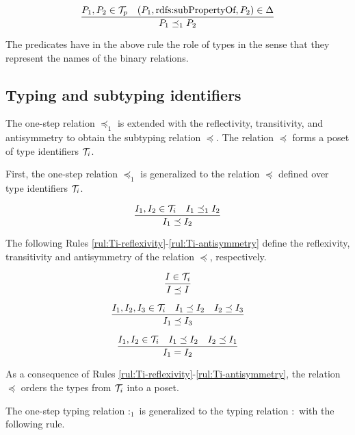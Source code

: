 \documentclass[runningheads]{llncs}
\newcommand{\DD}{{\Delta}}
\newcommand{\TT}{{\cal T}}
\begin{document}
\begin{equation}
\dfrac{P_1,P_2\in\TT_p \quad (P_1,\text{rdfs:subPropertyOf},P_2)\in\DD}
      {P_1\preceq_1\/P_2}
\end{equation}

The predicates have in the above rule the role of types in the sense
that they represent the names of the binary relations. 



\subsection{Typing and subtyping identifiers\label{sec:idents-typing}}

The one-step relation $\preceq_1$ is extended with the
reflectivity, transitivity, and antisymmetry to obtain the subtyping
relation $\preceq$. The relation $\preceq$ forms a poset of type
identifiers $\TT_i$.

First, the one-step relation $\preceq_1$ is generalized to the
relation $\preceq$ defined over type identifiers $\TT_i$.

\begin{equation}
\label{rul:Ic-extended}
\dfrac{I_1,I_2\in\TT_i \quad I_1\preceq_1\/I_2}
      {I_1 \preceq I_2}
\end{equation}

The following Rules \ref{rul:Ti-reflexivity}-\ref{rul:Ti-antisymmetry}
define the reflexivity, transitivity and antisymmetry of the
relation $\preceq$, respectively.

\begin{equation}
\label{rul:Ti-reflexivity}
\dfrac{I\in\TT_i}
      {I\preceq\/I}
\end{equation}

\begin{equation}
\label{rul:Ti-transitivity}
\dfrac{I_1,I_2,I_3\in\TT_i\quad\/I_1\preceq\/I_2\quad\/I_2\preceq\/I_3}
      {I_1\preceq\/I_3}   
\end{equation}

\begin{equation}
\label{rul:Ti-antisymmetry}
\dfrac{I_1,I_2\in\TT_i \quad I_1\preceq\/I_2 \quad I_2\preceq\/I_1}
      {I_1=I_2}   
\end{equation}

\noindent
As a consequence of Rules
\ref{rul:Ti-reflexivity}-\ref{rul:Ti-antisymmetry}, the relation
$\preceq$ orders the types from $\TT_i$ into a poset.

The one-step typing relation $:_1$ is generalized to the typing
relation $:$ with the following rule.
\end{document}
